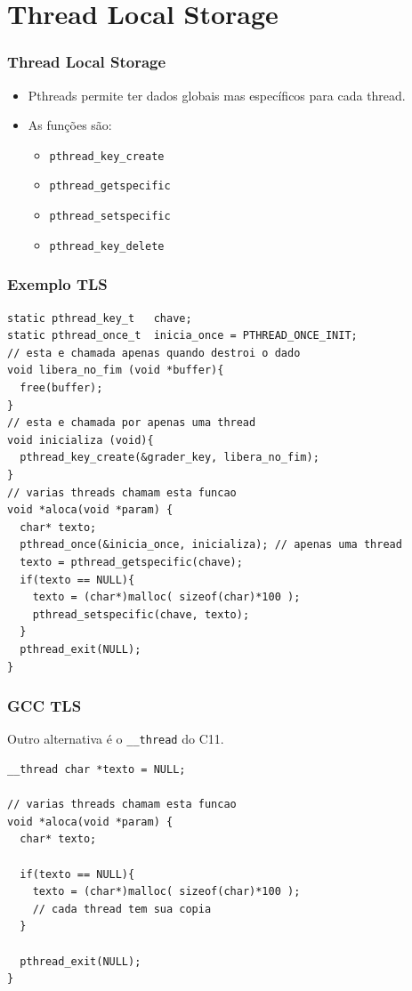 \documentclass[xcolor=dvipsnames,11pt,presentation,aspectratio=169]{beamer}
\begin{document}
\section{Thread Local Storage}
\begin{frame}
  \frametitle{Thread Local Storage}
  \begin{itemize}
  \item Pthreads permite ter dados globais mas específicos para cada thread.
  \item As funções são:
    \begin{itemize}
      \item \texttt{pthread\_key\_create}
      \item \texttt{pthread\_getspecific}
      \item \texttt{pthread\_setspecific}
      \item \texttt{pthread\_key\_delete}
    \end{itemize}  
  \end{itemize}
\end{frame}
\begin{frame}[fragile]
  \frametitle{Exemplo TLS}
  \vspace{-5mm}
\begin{lstlisting}
static pthread_key_t   chave;
static pthread_once_t  inicia_once = PTHREAD_ONCE_INIT;
// esta e chamada apenas quando destroi o dado
void libera_no_fim (void *buffer){
  free(buffer);
}
// esta e chamada por apenas uma thread
void inicializa (void){
  pthread_key_create(&grader_key, libera_no_fim);
}
// varias threads chamam esta funcao
void *aloca(void *param) { 
  char* texto;
  pthread_once(&inicia_once, inicializa); // apenas uma thread 
  texto = pthread_getspecific(chave);
  if(texto == NULL){
    texto = (char*)malloc( sizeof(char)*100 );
    pthread_setspecific(chave, texto);
  }
  pthread_exit(NULL);
}
\end{lstlisting}
\end{frame}
\begin{frame}[fragile]
  \frametitle{GCC TLS}
  \vspace{-5mm}
  Outro alternativa é o \texttt{\_\_thread} do C11.
\begin{lstlisting}
__thread char *texto = NULL;

// varias threads chamam esta funcao
void *aloca(void *param) { 
  char* texto;

  if(texto == NULL){
    texto = (char*)malloc( sizeof(char)*100 );
    // cada thread tem sua copia
  }

  pthread_exit(NULL);
}
\end{lstlisting}
\end{frame}
\end{document}
